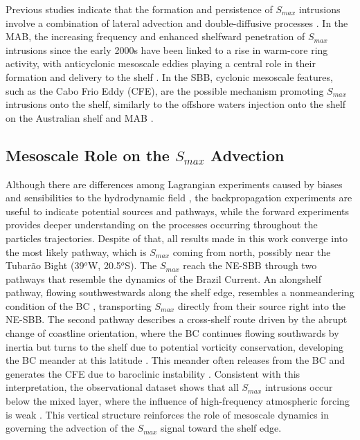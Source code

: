 \documentclass[draft]{agujournal2019}
\begin{document}
Previous studies indicate that the formation and persistence of \textit{$S_{max}$} intrusions involve a combination of lateral advection and double-diffusive processes \cite{Lentz2003, gawarkiewicz2022increasing, silva2023inventory, gawarkiewicz2025mapping}. In the MAB, the increasing frequency and enhanced shelfward penetration of \textit{$S_{max}$} intrusions since the early 2000s have been linked to a rise in warm-core ring activity, with anticyclonic mesoscale eddies playing a central role in their formation and delivery to the shelf \cite{gangopadhyay2019observed, silver2023increased}. In the SBB, cyclonic mesoscale features, such as the Cabo Frio Eddy (CFE), are the possible mechanism promoting \textit{$S_{max}$} intrusions onto the shelf, similarly to the offshore waters injection onto the shelf on the Australian shelf \cite{Malan2020} and MAB \cite{gawarkiewicz2025mapping}.

\subsection{Mesoscale Role on the \textit{$S_{max}$} Advection} 
\label{subsec:mesoscale_advection}

Although there are differences among Lagrangian experiments caused by biases and sensibilities to the hydrodynamic field \cite<further discussed on>{reijnders2026stability}, the backpropagation experiments are useful to indicate potential sources and pathways, while the forward experiments provides deeper understanding on the processes occurring throughout the particles trajectories. Despite of that, all results made in this work converge into the most likely pathway, which is \textit{$S_{max}$} coming from north, possibly near the Tubarão Bight (39$^o$W, 20.5$^o$S). The \textit{$S_{max}$} reach the NE-SBB through two pathways that resemble the dynamics of the Brazil Current. An alongshelf pathway, flowing southwestwards along the shelf edge, resembles a nonmeandering condition of the BC \cite{silveira2008}, transporting \textit{$S_{max}$} directly from their source right into the NE-SBB. The second pathway describes a cross-shelf route driven by the abrupt change of coastline orientation, where the BC continues flowing southwards by inertia but turns to the shelf due to potential vorticity conservation, developing the BC meander at this latitude \cite{mascarenhas1971study,silveira2008}. This meander often releases from the BC and generates the CFE due to baroclinic instability \cite{silveira2008,luko2022,rocha2022,uchoa2023,silveira2023}. Consistent with this interpretation, the observational dataset shows that all \textit{$S_{max}$} intrusions occur below the mixed layer, where the influence of high-frequency atmospheric forcing is weak \cite{giunta2022ocean}. This vertical structure reinforces the role of mesoscale dynamics in governing the advection of the \textit{$S_{max}$} signal toward the shelf edge.
\end{document}
